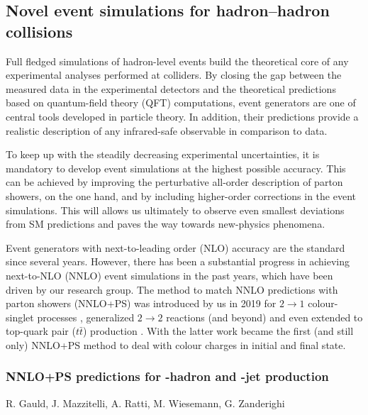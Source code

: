 \documentclass{FBR_Bericht_2025}
\begin{document}
\subsection{Novel event simulations for hadron--hadron collisions}
\begin{refsection}
Full fledged simulations of hadron-level events build the theoretical 
core of any experimental analyses performed at colliders.
By closing the gap between the measured data in the experimental
detectors and the theoretical predictions based on quantum-field theory
(QFT) computations, event generators are one of central tools developed
in particle theory. In addition, their predictions provide a realistic description
of any infrared-safe observable in comparison to data.

To keep up with the steadily decreasing experimental uncertainties, it is 
mandatory to develop event simulations at the highest possible accuracy.
This can be achieved by improving the perturbative all-order description 
of parton showers, on the one hand, and by including higher-order corrections
in the event simulations. This will allows us ultimately to observe even smallest
deviations from SM predictions and paves the way towards new-physics phenomena.

Event generators with next-to-leading order (NLO) accuracy are the standard since 
several years. However, there has been a substantial progress in achieving next-to-NLO
(NNLO) event simulations in the past years, which have been driven by our research
group. The \minnlo{} method to match NNLO predictions with parton showers (NNLO+PS)
was introduced by us in 2019 for $2\to 1$ colour-singlet 
processes \cite{Monni:2019whf,Monni:2020nks}, generalized $2\to 2$ reactions 
(and beyond) \cite{Lombardi:2020wju} and even extended to top-quark pair ($t\bar t$) production \cite{Mazzitelli:2020jio,Mazzitelli:2021mmm}. With the latter work \minnlo{} became the first 
(and still only) NNLO+PS method to deal with colour charges in initial and final state.
%
\subsubsection[NNLO+PS predictions for $B$-hadron and $b$-jet production]{NNLO+PS predictions for -hadron and -jet production}

\begin{Namen}
R. Gauld, J. Mazzitelli, A. Ratti, M. Wiesemann, G. Zanderighi
\end{Namen}


\end{refsection}
\end{document}
